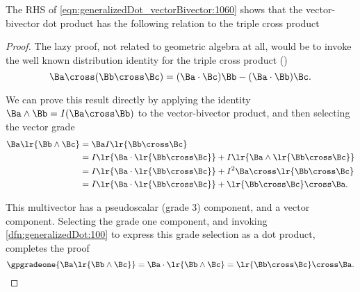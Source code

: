 The RHS of \cref{eqn:generalizedDot_vectorBivector:1060} shows that the vector-bivector dot product has the following relation to the
 triple cross product

\begin{proof}
The lazy proof, not related to geometric algebra at all, would be to invoke the well known
distribution identity for the triple cross product
(\citep{jackson1975cew})
\begin{dmath}\label{eqn:generalizedDot_vectorBivector:1100}
\Ba \cross ( \Bb \cross \Bc ) = (\Ba \cdot \Bc) \Bb - (\Ba \cdot \Bb) \Bc.
\end{dmath}

We can prove this result directly by applying the identity \( \Ba \wedge \Bb = I ( \Ba \cross \Bb ) \) to the vector-bivector product, and then selecting the vector grade
\begin{equation}\label{eqn:generalizedDot_vectorBivector:1000}
\begin{aligned}
\Ba \lr{ \Bb \wedge \Bc }
&= \Ba I \lr{ \Bb \cross \Bc } \\
&=
I \lr{ \Ba \cdot \lr{ \Bb \cross \Bc } }
+
I \lr{ \Ba \wedge \lr{ \Bb \cross \Bc } } \\
&=
I \lr{ \Ba \cdot \lr{ \Bb \cross \Bc } }
+
I^2 \Ba \cross \lr{ \Bb \cross \Bc } \\
&=
I \lr{ \Ba \cdot \lr{ \Bb \cross \Bc } }
+
\lr{ \Bb \cross \Bc } \cross \Ba.
\end{aligned}
\end{equation}

This multivector has a pseudoscalar (grade 3) component, and a vector component.  Selecting the grade one component,
and invoking \cref{dfn:generalizedDot:100} to express this grade selection as a dot product, completes the proof
\begin{equation}\label{eqn:generalizedDot_vectorBivector:1080}
\gpgradeone{ \Ba \lr{ \Bb \wedge \Bc } }
=
\Ba \cdot \lr{ \Bb \wedge \Bc }
=
\lr{ \Bb \cross \Bc } \cross \Ba.
\end{equation}
\end{proof}
